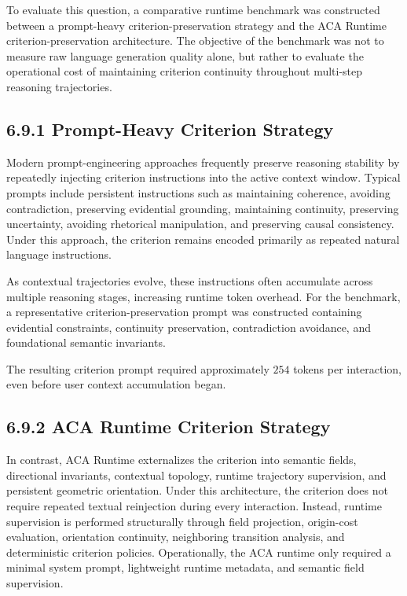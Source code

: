 \documentclass[11pt]{article}
\begin{document}
To evaluate this question, a comparative runtime benchmark was constructed between a prompt-heavy criterion-preservation strategy and the ACA Runtime criterion-preservation architecture. The objective of the benchmark was not to measure raw language generation quality alone, but rather to evaluate the operational cost of maintaining criterion continuity throughout multi-step reasoning trajectories.

\subsection{6.9.1 Prompt-Heavy Criterion Strategy}

Modern prompt-engineering approaches frequently preserve reasoning stability by repeatedly injecting criterion instructions into the active context window. Typical prompts include persistent instructions such as maintaining coherence, avoiding contradiction, preserving evidential grounding, maintaining continuity, preserving uncertainty, avoiding rhetorical manipulation, and preserving causal consistency. Under this approach, the criterion remains encoded primarily as repeated natural language instructions.

As contextual trajectories evolve, these instructions often accumulate across multiple reasoning stages, increasing runtime token overhead. For the benchmark, a representative criterion-preservation prompt was constructed containing evidential constraints, continuity preservation, contradiction avoidance, and foundational semantic invariants.

The resulting criterion prompt required approximately $254$ tokens per interaction, even before user context accumulation began.

\subsection{6.9.2 ACA Runtime Criterion Strategy}

In contrast, ACA Runtime externalizes the criterion into semantic fields, directional invariants, contextual topology, runtime trajectory supervision, and persistent geometric orientation. Under this architecture, the criterion does not require repeated textual reinjection during every interaction. Instead, runtime supervision is performed structurally through field projection, origin-cost evaluation, orientation continuity, neighboring transition analysis, and deterministic criterion policies. Operationally, the ACA runtime only required a minimal system prompt, lightweight runtime metadata, and semantic field supervision.
\end{document}

